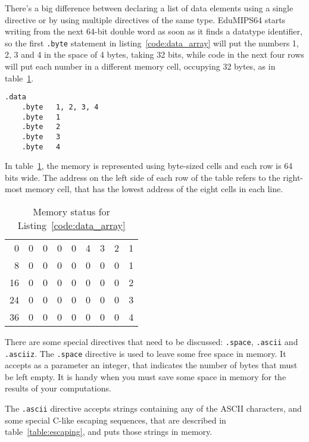 \documentclass[12pt]{report}
\newcommand{\EM}{EduMIPS64}
\begin{document}
 There's a big difference between declaring a list of data elements
using a single directive or by using multiple directives of the same type. \EM{}
starts writing from the next 64-bit double word as soon as it finds a datatype identifier,
so the first \texttt{.byte} statement in listing~\ref{code:data_array} will put
the numbers 1, 2, 3 and 4 in the space of 4 bytes, taking 32 bits, while code in
the next four rows will put each number in a different memory cell, occupying 32
bytes, as in table~\ref{table:effect}.

\begin{lstlisting}[caption={Adjacent bytes}, label={code:data_array}, style={mips}]
	.data
	.byte	1, 2, 3, 4
	.byte	1
	.byte	2
	.byte	3
	.byte	4
\end{lstlisting}

In table~\ref{table:effect}, the memory is represented using byte-sized cells
and each row is 64 bits wide. The address on the left side of each row of the
table refers to the right-most memory cell, that has the lowest address of the
eight cells in each line.

\begin{table}[htb]
	\begin{centering}
		\begin{tabular}{r|c|c|c|c|c|c|c|c|}
			\cline{2-9}
			0 & 0 & 0 & 0 & 0 &4 & 3 &2 &1 \\
			\cline{2-9}
			8 & 0 & 0 & 0 & 0 &0 & 0 &0 &1 \\
			\cline{2-9}
			16 & 0 & 0 & 0 & 0 &0 & 0 &0 &2 \\
			\cline{2-9}
			24 & 0 & 0 & 0 & 0 &0 & 0 &0 &3 \\
			\cline{2-9}
			36 & 0 & 0 & 0 & 0 &0 & 0 &0 &4\\ 
			\cline{2-9}
		\end{tabular}
		\caption{Memory status for Listing~\ref{code:data_array}}
		\label{table:effect}
	\end{centering}
\end{table}
There are some special directives that need to be discussed: \texttt{.space}, 
\texttt{.ascii} and \texttt{.asciiz}.
The \texttt{.space} directive is used to leave some free space in memory. It
accepts as a parameter an integer, that indicates the number of bytes that must
be left empty. It is handy when you must save some space in memory for the
results of your computations.

The \texttt{.ascii} directive accepts strings containing any of the ASCII
characters, and some special C-like escaping sequences, that are described in
table~\ref{table:escaping}, and puts those strings in memory.
\end{document}
